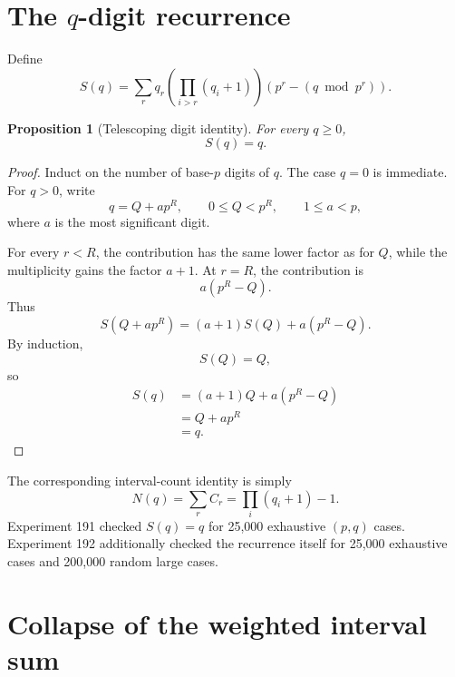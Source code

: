 \documentclass[11pt,a4paper]{article}
\newtheorem{proposition}[theorem]{Proposition}
\theoremstyle{definition}
\theoremstyle{remark}
\begin{document}
\section{The $q$-digit recurrence}

Define
\begin{equation}
 S(q)=
 \sum_r
 q_r\left(\prod_{i>r}(q_i+1)\right)
 \left(p^r-(q\bmod p^r)\right).
 \label{eq:S-def}
\end{equation}

\begin{proposition}[Telescoping digit identity]
\label{prop:S-q}
For every $q\ge0$,
\begin{equation}
\boxed{S(q)=q}.
\label{eq:S-q}
\end{equation}
\end{proposition}

\begin{proof}
Induct on the number of base-$p$ digits of $q$.  The case $q=0$ is immediate.  For $q>0$, write
\begin{equation}
 q=Q+ap^R,
 \qquad 0\le Q<p^R,
 \qquad 1\le a<p,
\end{equation}
where $a$ is the most significant digit.

For every $r<R$, the contribution has the same lower factor as for $Q$, while the multiplicity gains the factor $a+1$.  At $r=R$, the contribution is
\[
a(p^R-Q).
\]
Thus
\begin{equation}
 S(Q+ap^R)=(a+1)S(Q)+a(p^R-Q).
 \label{eq:S-recurrence}
\end{equation}
By induction,
\[
S(Q)=Q,
\]
so
\begin{align}
S(q)
&=(a+1)Q+a(p^R-Q)\\
&=Q+ap^R\\
&=q.
\end{align}
\end{proof}

The corresponding interval-count identity is simply
\begin{equation}
 N(q)=\sum_r C_r=\prod_i(q_i+1)-1.
 \label{eq:N-def}
\end{equation}
Experiment 191 checked $S(q)=q$ for 25,000 exhaustive $(p,q)$ cases.  Experiment 192 additionally checked the recurrence itself for 25,000 exhaustive cases and 200,000 random large cases.

\section{Collapse of the weighted interval sum}
\end{document}
